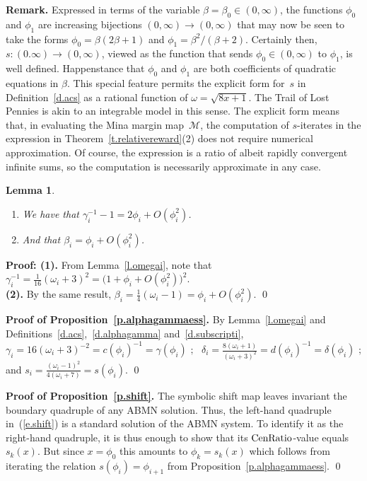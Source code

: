 \documentclass[letterpaper,11pt,oneside,reqno]{amsbook}
\numberwithin{figure}{chapter}
\newtheorem{lemma}[theorem]{Lemma}
\theoremstyle{definition}
\theoremstyle{definition}
\theoremstyle{definition}
\theoremstyle{definition}
\theoremstyle{definition}
\newcommand{\mc}{\mathcal}
\newcommand{\centralratio}{{\rm CenRatio}}
\newcommand{\macsee}{c}
\newcommand{\macbeta}{\beta}
\newcommand{\macomega}{\omega}
\newcommand{\macdee}{d}
\newcommand{\macphi}{\phi}
\newcommand{\macgsee}{\gamma}
\newcommand{\macgdee}{\delta}
\newcommand{\abmnmacspace}{\textrm{ABMN} }
\begin{document}
{\bf Remark.} Expressed in terms of the variable $\beta = \beta_0 \in (0,\infty)$, the functions $\phi_0$ and $\phi_1$  are increasing bijections $(0,\infty) \to (0,\infty)$ 
that may now be seen to take the forms
$\phi_0 = \beta(2\beta+1)$ and $\phi_1 = \beta^2/(\beta +2)$.
Certainly then, $s:(0.\infty) \to (0,\infty)$, viewed as the function that sends $\phi_0 \in (0,\infty)$ to $\phi_1$, is well defined. Happenstance that $\phi_0$ and $\phi_1$ are both coefficients of quadratic equations in $\beta$. This special feature permits the explicit form for~$s$ in Definition~\ref{d.acs} as a rational function of $\omega = \sqrt{8x+1}$. The Trail of Lost Pennies is akin to an integrable model in this sense. The explicit form means that, in evaluating the Mina margin map~$\mc{M}$, the computation of $s$-iterates in the expression in Theorem~\ref{t.relativereward}(2) does not require numerical approximation. Of course, the expression is a ratio of albeit rapidly convergent infinite sums, so the computation is necessarily approximate in any case. 
 
\begin{lemma}\label{l.omega.asymptotic}
\leavevmode
\begin{enumerate}
\item
We have that
$\macgsee_i^{-1}  -1  = 2\macphi_i + O(\macphi_i^2)$.
\item
And that
$\macbeta_i = \macphi_i + O(\macphi_i^2)$.
\end{enumerate}
\end{lemma}
{\bf Proof: (1).} From Lemma~\ref{l.omegai}, note that $\macgsee_i^{-1} = \tfrac{1}{16} (\omega_i + 3)^2 = \big( 1 + \phi_i + O(\phi_i^2)\big)^2$. \\
{\bf (2).} By the same result, $\macbeta_i = \tfrac{1}{4}(\omega_i - 1) = \macphi_i + O(\macphi_i^2)$.
\qed


{\bf Proof of Proposition~\ref{p.alphagammaess}.}
By Lemma~\ref{l.omegai} and Definitions~\ref{d.acs},~\ref{d.alphagamma} and~\ref{d.subscripti}, 
$$\macgsee_i = 16(\macomega_i + 3)^{-2}  =\macsee(\macphi_i)^{-1} = \macgsee(\macphi_i) \, \, ; \, \, \, \, 
 \macgdee_i = \tfrac{8(\macomega_i +1)}{(\macomega_i + 3)^2}  =\macdee(\macphi_i)^{-1} = \macgdee(\macphi_i) \, \, ;
 $$
  and $s_i = \tfrac{(\macomega_i - 1)^2}{4(\macomega_i +7)} = s(\macphi_i)$. \qed 



  {\bf Proof of Proposition~\ref{p.shift}.}
  The symbolic shift map leaves invariant the boundary quadruple of any \abmnmacspace solution. Thus,
  the left-hand quadruple in~(\ref{e.shift}) is a standard solution of the \abmnmacspace system. To identify it as the right-hand quadruple, it is thus enough to show that its  
 $\centralratio$-value equals $s_k(x)$. But  since $x = \phi_0$ this amounts to   $\phi_k = s_k(x)$ which follows from iterating the relation $s(\phi_i) =\phi_{i+1}$ from Proposition~\ref{p.alphagammaess}. \qed  
\end{document}
